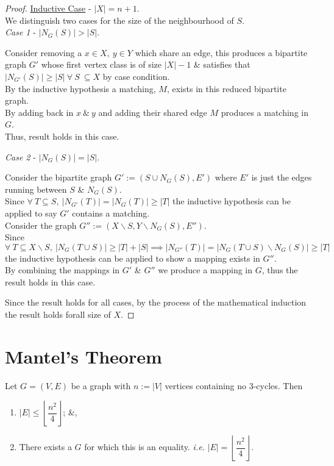 \documentclass[11pt,a4paper]{article}
\begin{document}
\begin{proof}
\underline{Inductive Case} - $|X|=n+1$.\\
We distinguish two cases for the size of the neighbourhood of $S$.\\
\textit{Case 1} - $|N_G(S)|>|S|$.
\begin{adjustwidth}{1cm}{}
Consider removing a $x\in X,\ y\in Y$ which share an edge, this produces a bipartite graph $G'$ whose first vertex class is of size $|X|-1$ \& satisfies that $|N_{G'}(S)|\geq|S|\ \forall\ S\ \subseteq X$ by case condition.\\
By the inductive hypothesis a matching, $M$, exists in this reduced bipartite graph.\\
By adding back in $x\ \&\ y$ and adding their shared edge $M$ produces a matching in $G$.\\
Thus, result holds in this case.
\end{adjustwidth}
\textit{Case 2} - $|N_G(S)|=|S|$.
\begin{adjustwidth}{1cm}{}
Consider the bipartite graph $G':=(S\cup N_G(S), E')$ where $E'$ is just the edges running between $S$ \& $N_G(S)$.\\
Since $\forall\ T\subseteq S,\ |N_{G'}(T)|=|N_G(T)|\geq|T|$ the inductive hypothesis can be applied to say $G'$ contains a matching.\\
Consider the graph $G'':=(X\backslash S,Y\backslash N_G(S),E'')$.\\
Since $\forall\ T\subseteq X\backslash S,\ |N_G(T\cup S)|\geq|T|+|S|\implies|N_{G''}(T)|=|N_G(T\cup S)\backslash N_G(S)|\geq|T|$ the inductive hypothesis can be applied to show a mapping exists in $G''$.\\
By combining the mappings in $G'$ \& $G''$ we produce a mapping in $G$, thus the result holds in this case.\\
\end{adjustwidth}
Since the result holds for all cases, by the process of the mathematical induction the result holds forall size of $X$.
\end{proof}

\newpage
\section*{Mantel's Theorem}
Let $G=(V,E)$ be a graph with $n:=|V|$ vertices containing no 3-cycles. Then
\begin{enumerate}
	\item $|E|\leq\left\lfloor\dfrac{n^2}{4}\right\rfloor$; \&,
	\item There exists a $G$ for which this is an equality. \textit{i.e.} $|E|=\left\lfloor\dfrac{n^2}{4}\right\rfloor$.
\end{enumerate}
\end{document}

